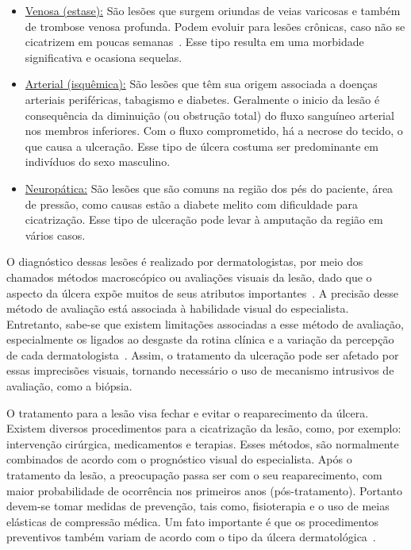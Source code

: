 \begin{itemize}
\item \underline{Venosa (estase):} São lesões que surgem oriundas de veias varicosas e também de trombose venosa profunda. 
Podem evoluir para lesões crônicas, caso não se cicatrizem em poucas semanas~\cite{Abbade2005}.
Esse tipo resulta em uma morbidade significativa e ocasiona sequelas.

\item \underline{Arterial (isquêmica):} São lesões que têm sua origem associada a doenças arteriais periféricas, tabagismo e diabetes.
Geralmente o inicio da lesão é consequência da diminuição (ou obstrução total) do fluxo sanguíneo arterial nos membros inferiores.
Com o fluxo comprometido, há a necrose do tecido, o que causa a ulceração.
Esse tipo de úlcera costuma ser predominante em indivíduos do sexo masculino.

\item \underline{Neuropática:} São lesões que são comuns na região dos pés do paciente, área de pressão, como causas estão a diabete melito com dificuldade para cicatrização. 
Esse tipo de ulceração pode levar à amputação da região em vários casos.
\end{itemize}

O diagnóstico dessas lesões é realizado por dermatologistas, por meio dos chamados métodos macroscópico ou avaliações visuais da lesão, dado que o aspecto da úlcera expõe muitos de seus atributos importantes~\cite{Pereira2011}.
A precisão desse método de avaliação está associada à habilidade visual do especialista.
Entretanto, sabe-se que existem limitações associadas a esse método de avaliação, especialmente os ligados ao desgaste da rotina clínica e a variação da percepção de cada dermatologista~\cite{Maglogiannis2005}. 
Assim, o tratamento da ulceração pode ser afetado por essas imprecisões visuais, tornando necessário o uso de mecanismo intrusivos de avaliação, como a biópsia.

O tratamento para a lesão visa fechar e evitar o reaparecimento da úlcera.
Existem diversos procedimentos para a cicatrização da lesão, como, por exemplo: intervenção cirúrgica, medicamentos e terapias. 
Esses métodos, são normalmente combinados de acordo com o prognóstico visual do especialista.
Após o tratamento da lesão, a preocupação passa ser com o seu reaparecimento, com maior probabilidade de ocorrência nos primeiros anos (pós-tratamento).
Portanto devem-se tomar medidas de prevenção, tais como, fisioterapia e o uso de meias elásticas de compressão médica.
Um fato importante é que os procedimentos preventivos também variam de acordo com o tipo da úlcera dermatológica~\cite{Abbade2005}.

